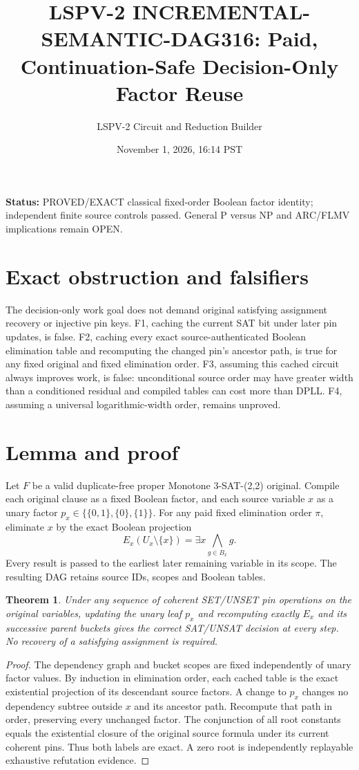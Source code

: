 \documentclass[11pt]{article}
\title{LSPV-2 INCREMENTAL-SEMANTIC-DAG316: Paid, Continuation-Safe Decision-Only Factor Reuse}
\author{LSPV-2 Circuit and Reduction Builder}
\date{November 1, 2026, 16:14 PST}
\newtheorem{theorem}{Theorem}
\begin{document}
\maketitle
\noindent\textbf{Status:} PROVED/EXACT classical fixed-order Boolean factor identity; independent finite source controls passed. General P versus NP and ARC/FLMV implications remain OPEN.
\section{Exact obstruction and falsifiers}
The decision-only work goal does not demand original satisfying assignment recovery or injective pin keys. F1, caching the current SAT bit under later pin updates, is false. F2, caching every exact source-authenticated Boolean elimination table and recomputing the changed pin's ancestor path, is true for any fixed original and fixed elimination order. F3, assuming this cached circuit always improves work, is false: unconditional source order may have greater width than a conditioned residual and compiled tables can cost more than DPLL. F4, assuming a universal logarithmic-width order, remains unproved.
\section{Lemma and proof}
Let $F$ be a valid duplicate-free proper Monotone 3-SAT-(2,2) original. Compile each original clause as a fixed Boolean factor, and each source variable $x$ as a unary factor $p_x\in\{\{0,1\},\{0\},\{1\}\}$. For any paid fixed elimination order $\pi$, eliminate $x$ by the exact Boolean projection
\[E_x(U_x\setminus\{x\})=\exists x\bigwedge_{g\in B_x}g.\]
Every result is passed to the earliest later remaining variable in its scope. The resulting DAG retains source IDs, scopes and Boolean tables.
\begin{theorem}
Under any sequence of coherent SET/UNSET pin operations on the original variables, updating the unary leaf $p_x$ and recomputing exactly $E_x$ and its successive parent buckets gives the correct SAT/UNSAT decision at every step. No recovery of a satisfying assignment is required.
\end{theorem}
\begin{proof}The dependency graph and bucket scopes are fixed independently of unary factor values. By induction in elimination order, each cached table is the exact existential projection of its descendant source factors. A change to $p_x$ changes no dependency subtree outside $x$ and its ancestor path. Recompute that path in order, preserving every unchanged factor. The conjunction of all root constants equals the existential closure of the original source formula under its current coherent pins. Thus both labels are exact. A zero root is independently replayable exhaustive refutation evidence.\end{proof}
\end{document}

